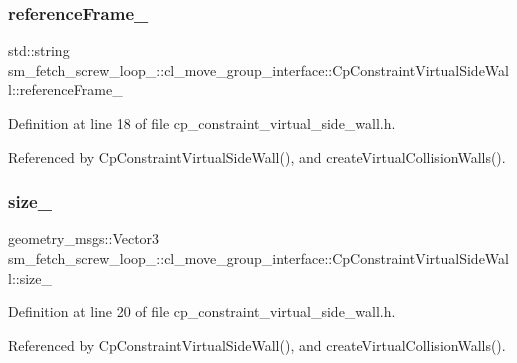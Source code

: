 \subsubsection{\texorpdfstring{reference\+Frame\+\_\+}{referenceFrame\_}}
{\footnotesize\ttfamily std\+::string sm\+\_\+fetch\+\_\+screw\+\_\+loop\+\_\+::cl\+\_\+move\+\_\+group\+\_\+interface\+::\+Cp\+Constraint\+Virtual\+Side\+Wall\+::reference\+Frame\+\_\+\hspace{0.3cm}{\ttfamily [private]}}



Definition at line 18 of file cp\+\_\+constraint\+\_\+virtual\+\_\+side\+\_\+wall.\+h.



Referenced by Cp\+Constraint\+Virtual\+Side\+Wall(), and create\+Virtual\+Collision\+Walls().

\mbox{\label{classsm__fetch__screw__loop__1_1_1cl__move__group__interface_1_1CpConstraintVirtualSideWall_ab495461dac422e249302ec9be8e9e17a}} 
\subsubsection{\texorpdfstring{size\+\_\+}{size\_}}
{\footnotesize\ttfamily geometry\+\_\+msgs\+::\+Vector3 sm\+\_\+fetch\+\_\+screw\+\_\+loop\+\_\+::cl\+\_\+move\+\_\+group\+\_\+interface\+::\+Cp\+Constraint\+Virtual\+Side\+Wall\+::size\+\_\+\hspace{0.3cm}{\ttfamily [private]}}



Definition at line 20 of file cp\+\_\+constraint\+\_\+virtual\+\_\+side\+\_\+wall.\+h.



Referenced by Cp\+Constraint\+Virtual\+Side\+Wall(), and create\+Virtual\+Collision\+Walls().



